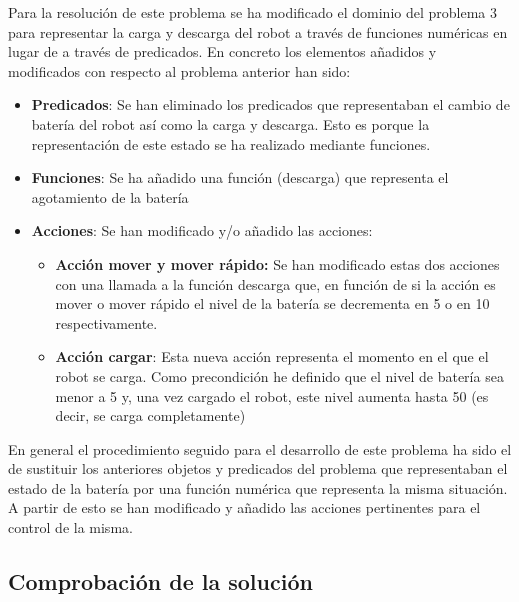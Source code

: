 Para la resolución de este problema se ha modificado el dominio del problema 3 para representar la carga y descarga del robot a través de funciones numéricas en lugar de a través de predicados. En concreto los elementos añadidos y modificados con respecto al problema anterior han sido:
\begin{itemize} 

	\item \textbf{Predicados}: Se han eliminado los predicados que representaban el cambio de batería del robot así como la carga y descarga. Esto es porque la representación de este estado se ha realizado mediante funciones.
	
	\item \textbf{Funciones}: Se ha añadido una función (descarga) que representa el agotamiento de la batería
	
	\item \textbf{Acciones}: Se han modificado y/o añadido las acciones:

	\begin{itemize}
	
		\item \textbf{Acción mover y mover rápido:} Se han modificado estas dos acciones con una llamada a la función descarga que, en función de si la acción es mover o mover rápido el nivel de la batería se decrementa en 5 o en 10 respectivamente.
		
		\item \textbf{Acción cargar}: Esta nueva acción representa el momento en el que el robot se carga. Como precondición he definido que el nivel de batería sea menor a 5 y, una vez cargado el robot, este nivel aumenta hasta 50 (es decir, se carga completamente)
	
	\end{itemize}	

	
\end{itemize}


	En general el procedimiento seguido para el desarrollo de este problema ha sido el de sustituir los anteriores objetos y predicados del problema que representaban el estado de la batería por una función numérica que representa la misma situación. A partir de esto se han modificado y añadido las acciones pertinentes para el control de la misma. \\
\newpage
\subsection{Comprobación de la solución}

